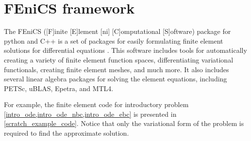 \section{FEniCS framework}

The FEniCS ([F]inite [E]lement [ni] [C]omputational [S]oftware)  package for python and C++ is a set of packages for easily formulating finite element solutions for differential equations \citep{logg_2012}.  This software includes tools for automatically creating a variety of finite element function spaces, differentiating variational functionals, creating finite element meshes, and much more.  It also includes several linear algebra packages for solving the element equations, including PETSc, uBLAS, Epetra, and MTL4.

For example, the finite element code for introductory problem \cref{intro_ode,intro_ode_nbc,intro_ode_ebc} is presented in \cref{scratch_example_code}.  Notice that only the variational form of the problem is required to find the approximate solution.

